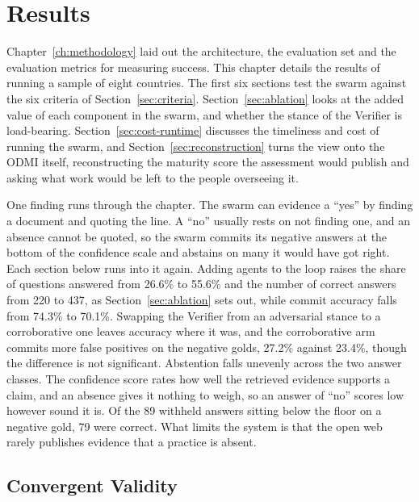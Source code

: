 \chapter{Results}\label{ch:results}

Chapter~\ref{ch:methodology} laid out the architecture, the evaluation set and the evaluation metrics for measuring success. This chapter details the results of running a sample of eight countries. The first six sections test the swarm against the six criteria of Section~\ref{sec:criteria}. Section~\ref{sec:ablation} looks at the added value of each component in the swarm, and whether the stance of the Verifier is load-bearing. Section~\ref{sec:cost-runtime} discusses the timeliness and cost of running the swarm, and Section~\ref{sec:reconstruction} turns the view onto the ODMI itself, reconstructing the maturity score the assessment would publish and asking what work would be left to the people overseeing it.

One finding runs through the chapter. The swarm can evidence a ``yes'' by finding a document and quoting the line. A ``no'' usually rests on not finding one, and an absence cannot be quoted, so the swarm commits its negative answers at the bottom of the confidence scale and abstains on many it would have got right. Each section below runs into it again. Adding agents to the loop raises the share of questions answered from 26.6\% to 55.6\% and the number of correct answers from 220 to 437, as Section~\ref{sec:ablation} sets out, while commit accuracy falls from 74.3\% to 70.1\%. Swapping the Verifier from an adversarial stance to a corroborative one leaves accuracy where it was, and the corroborative arm commits more false positives on the negative golds, 27.2\% against 23.4\%, though the difference is not significant. Abstention falls unevenly across the two answer classes. The confidence score rates how well the retrieved evidence supports a claim, and an absence gives it nothing to weigh, so an answer of ``no'' scores low however sound it is. Of the 89 withheld answers sitting below the floor on a negative gold, 79 were correct. What limits the system is that the open web rarely publishes evidence that a practice is absent.

\section{Convergent Validity}\label{sec:convergent-validity}


